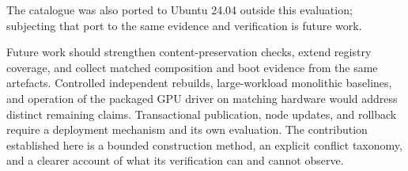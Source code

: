 The catalogue was also ported to Ubuntu \num{24.04} outside this evaluation; subjecting that port to the same evidence and verification is future work.

Future work should strengthen content-preservation checks, extend registry coverage, and collect matched composition and boot evidence from the same artefacts. Controlled independent rebuilds, large-workload monolithic baselines, and operation of the packaged GPU driver on matching hardware would address distinct remaining claims. Transactional publication, node updates, and rollback require a deployment mechanism and its own evaluation. The contribution established here is a bounded construction method, an explicit conflict taxonomy, and a clearer account of what its verification can and cannot observe.
